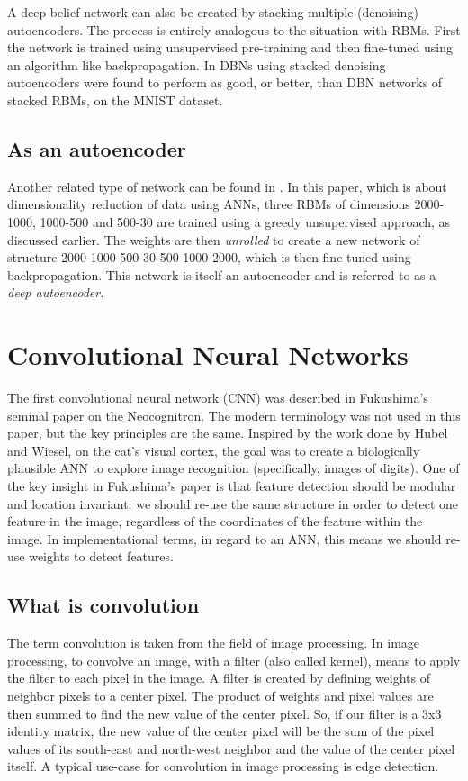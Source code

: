 \documentclass[11pt]{article}
\begin{document}
A deep belief network can also be created by stacking multiple (denoising) autoencoders.  The process is entirely analogous to the situation with RBMs.  First the network is trained using unsupervised pre-training and then fine-tuned using an algorithm like backpropagation.  In \cite{bengio07} DBNs using stacked denoising autoencoders were found to perform as good, or better, than DBN networks of stacked RBMs, on the MNIST dataset.

\subsection{As an autoencoder}

Another related type of network can be found in \cite{hinton06reducing}.  In this paper, which is about dimensionality reduction of data using ANNs, three RBMs of dimensions 2000-1000, 1000-500 and 500-30 are trained using a greedy unsupervised approach, as discussed earlier.  The weights are then \textit{unrolled} to create a new network of structure 2000-1000-500-30-500-1000-2000, which is then fine-tuned using backpropagation.  This network is itself an autoencoder and is referred to as a \textit{deep autoencoder}.

\section{Convolutional Neural Networks}

The first convolutional neural network (CNN) was described in Fukushima's seminal paper on the Neocognitron\cite{fukushima}.  The modern terminology was not used in this paper, but the key principles are the same.  Inspired by the work done by Hubel and Wiesel, on the cat's visual cortex\cite{hubel}, the goal was to create a biologically plausible ANN to explore image recognition (specifically, images of digits).  One of the key insight in Fukushima's paper is that feature detection should be modular and location invariant: we should re-use the same structure in order to detect one feature in the image, regardless of the coordinates of the feature within the image.  In implementational terms, in regard to an ANN, this means we should re-use weights to detect features.

\subsection{What is convolution}

The term convolution is taken from the field of image processing.  In image processing, to convolve an image, with a filter (also called kernel), means to apply the filter to each pixel in the image.  A filter is created by defining weights of neighbor pixels to a center pixel.  The product of weights and pixel values are then summed to find the new value of the center pixel.  So, if our filter is a 3x3 identity matrix, the new value of the center pixel will be the sum of the pixel values of its south-east and north-west neighbor and the value of the center pixel itself.  A typical use-case for convolution in image processing is edge detection.
\end{document}
